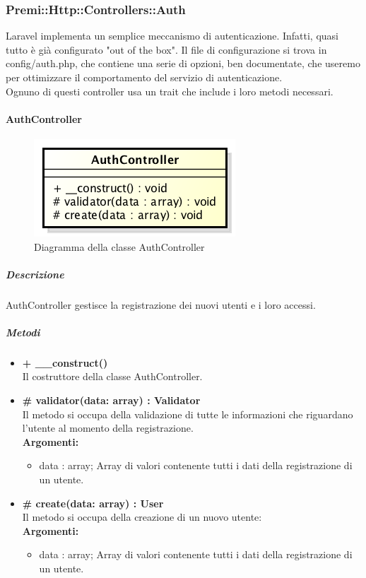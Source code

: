 \newpage
\subsubsection{Premi::Http::Controllers::Auth}
Laravel implementa un semplice meccanismo di autenticazione. Infatti, quasi tutto è già configurato "out of the box". Il file di configurazione si trova in config/auth.php, che contiene una serie di opzioni, ben documentate, che useremo per ottimizzare il comportamento del servizio di autenticazione.\\
Ognuno di questi controller usa un trait che include i loro metodi necessari.
	\paragraph{AuthController}
	\begin{figure}[h]
\centering
\includegraphics[width=0.5\linewidth]{img/back_end_http_controllers_authController}
\caption[Diagramma della classe AuthController]{Diagramma della classe AuthController}
\label{fig:back_end_http_controllers_authController}
\end{figure}
		\subparagraph{Descrizione}
			AuthController gestisce la registrazione dei nuovi utenti e i loro accessi.
		\subparagraph{Metodi}
			\begin{itemize}
				\item \textbf{+ \_\_construct()}\\
				Il costruttore della classe AuthController.
				\item \textbf{\# validator(data: array) : Validator}\\
				Il metodo si occupa della validazione di tutte le informazioni che riguardano l'utente al momento della registrazione.\\
					\textbf{Argomenti:}
						\begin{itemize}
							\item data : array;
							Array di valori contenente tutti i dati della registrazione di un utente. 
						\end{itemize}
				\item \textbf{\# create(data: array) : User}\\
				Il metodo si occupa della creazione di un nuovo utente:\\
					\textbf{Argomenti:}
						\begin{itemize}
							\item data : array;
							Array di valori contenente tutti i dati della registrazione di un utente.
						\end{itemize}
			\end{itemize}
		
